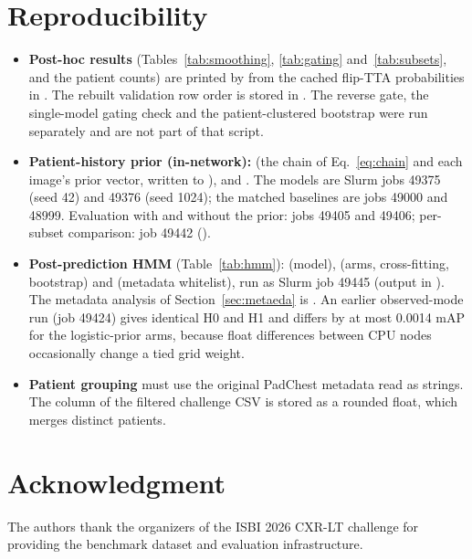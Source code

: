 \documentclass[conference]{IEEEtran}
\begin{document}
\section*{Reproducibility}
\begin{itemize}
\item \textbf{Post-hoc results} (Tables~\ref{tab:smoothing}, \ref{tab:gating} and~\ref{tab:subsets}, and the patient counts) are printed by  from the cached flip-TTA probabilities in . The rebuilt validation row order is stored in . The reverse gate, the single-model gating check and the patient-clustered bootstrap were run separately and are not part of that script.
\item \textbf{Patient-history prior (in-network):}  (the chain of Eq.~\eqref{eq:chain} and each image's prior vector, written to ),  and . The models are Slurm jobs 49375 (seed 42) and 49376 (seed 1024); the matched baselines are jobs 49000 and 48999. Evaluation with and without the prior: jobs 49405 and 49406; per-subset comparison: job 49442 ().
\item \textbf{Post-prediction HMM} (Table~\ref{tab:hmm}):  (model),  (arms, cross-fitting, bootstrap) and  (metadata whitelist), run as Slurm job 49445 (output in ). The metadata analysis of Section~\ref{sec:metaeda} is . An earlier observed-mode run (job 49424) gives identical H0 and H1 and differs by at most 0.0014 mAP for the logistic-prior arms, because float differences between CPU nodes occasionally change a tied grid weight.
\item \textbf{Patient grouping} must use the original PadChest metadata read as strings. The  column of the filtered challenge CSV is stored as a rounded float, which merges distinct patients.
\end{itemize}

\section*{Acknowledgment}
The authors thank the organizers of the ISBI 2026 CXR-LT challenge for providing the benchmark dataset and evaluation infrastructure.
\end{document}
